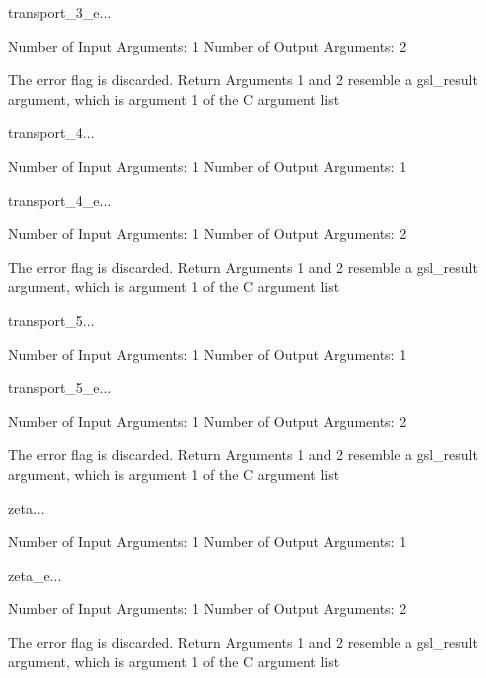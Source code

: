 \begin{funcdesc}{transport_3_e}{...}

    Number of Input  Arguments:  1
    Number of Output Arguments:  2

The error flag is discarded.
Return Arguments 1 and 2 resemble a gsl_result argument,
	which is  argument 1 of the C argument list

\end{funcdesc}

\begin{funcdesc}{transport_4}{...}

    Number of Input  Arguments:  1
    Number of Output Arguments:  1
\end{funcdesc}

\begin{funcdesc}{transport_4_e}{...}

    Number of Input  Arguments:  1
    Number of Output Arguments:  2

The error flag is discarded.
Return Arguments 1 and 2 resemble a gsl_result argument,
	which is  argument 1 of the C argument list

\end{funcdesc}

\begin{funcdesc}{transport_5}{...}

    Number of Input  Arguments:  1
    Number of Output Arguments:  1
\end{funcdesc}

\begin{funcdesc}{transport_5_e}{...}

    Number of Input  Arguments:  1
    Number of Output Arguments:  2

The error flag is discarded.
Return Arguments 1 and 2 resemble a gsl_result argument,
	which is  argument 1 of the C argument list

\end{funcdesc}

\begin{funcdesc}{zeta}{...}

    Number of Input  Arguments:  1
    Number of Output Arguments:  1
\end{funcdesc}

\begin{funcdesc}{zeta_e}{...}

    Number of Input  Arguments:  1
    Number of Output Arguments:  2

The error flag is discarded.
Return Arguments 1 and 2 resemble a gsl_result argument,
	which is  argument 1 of the C argument list

\end{funcdesc}

